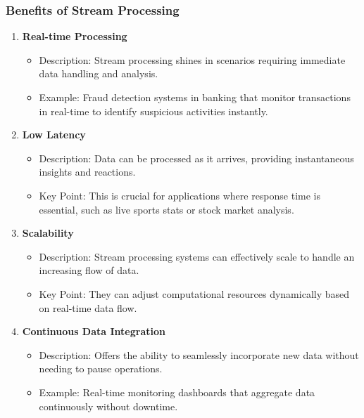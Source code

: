 \documentclass{beamer}
\begin{document}
\begin{frame}[fragile]
    \frametitle{Benefits of Stream Processing}
    \begin{enumerate}
        \item \textbf{Real-time Processing}
        \begin{itemize}
            \item Description: Stream processing shines in scenarios requiring immediate data handling and analysis.
            \item Example: Fraud detection systems in banking that monitor transactions in real-time to identify suspicious activities instantly.
        \end{itemize}
        \item \textbf{Low Latency}
        \begin{itemize}
            \item Description: Data can be processed as it arrives, providing instantaneous insights and reactions.
            \item Key Point: This is crucial for applications where response time is essential, such as live sports stats or stock market analysis.
        \end{itemize}
        \item \textbf{Scalability}
        \begin{itemize}
            \item Description: Stream processing systems can effectively scale to handle an increasing flow of data.
            \item Key Point: They can adjust computational resources dynamically based on real-time data flow.
        \end{itemize}
        \item \textbf{Continuous Data Integration}
        \begin{itemize}
            \item Description: Offers the ability to seamlessly incorporate new data without needing to pause operations.
            \item Example: Real-time monitoring dashboards that aggregate data continuously without downtime.
        \end{itemize}
    \end{enumerate}
\end{frame}
\end{document}
